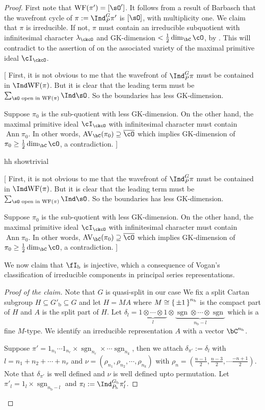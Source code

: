 \documentclass[12pt,a4paper]{amsart}
\newcommand{\trivial}[2][]{\if\relax\detokenize{#1}\relax
  {%
      \color{orange} \vspace{0em} $[$  #2 $]$
      \color{black}
  }
  \else
\ifx#1h
\ifcsname showtrivial\endcsname
{%
    \color{orange} \vspace{0em}  $[$ #2 $]$
    \color{black}
}
\fi
\else {\red Wrong argument!} \fi
\fi
}
\newcommand{\WF}{\mathrm{WF}}
\newcommand{\AV}{\mathrm{AV}}
\DeclareMathOperator{\Ann}{Ann}
\newcommand{\sgn}{\operatorname{sgn}}
\numberwithin{equation}{section}
\theoremstyle{remark}
\def\half{{\tfrac{1}{2}}}
\def\lamck{\lambda_\ckcO}
\def\nnb{n_{\mathrm b}}
\def\Gb{G_{\mathrm b}}
\def\Gpb{G'_{\mathrm b}}
\def\Pb{P_{\mathrm b}}
\newcommand{\Grt}{\cK}
\begin{document}
\begin{proof} First note that $\WF(\pi')=[\sO']$.
  It follows from a result of Barbasch \cite[Corollary 5.0.10]{B.Orbit} that the
  wavefront cycle of $\pi:=\Ind_{P}^{G}\pi'$ is $[\sO]$, with multiplicity one.
  We claim that $\pi$ is irreducible. If not, $\pi$ must contain an irreducible subquotient with infinitesimal
  character $\lambda_{\ckcO}$ and GK-dimension $<\half\dim_{\bC}\cO$, by \cite[Korollar 3.6]{BK}. This will
  contradict to the assertion of  on the associated variety of the maximal primitive ideal $\cI_{\ckcO}$.
  \trivial[h]{
    First, it is not obvious to me that the wavefront of $\Ind_{P}^{G}\pi$
    must be contained in $\Ind\WF(\pi)$. But it is clear that the leading term
    must be $\sum_{\sO\text{ open in } \WF(\pi)}\Ind\sO$. So the boundaries has
    less GK-dimension.

    Suppose $\pi_{0}$ is the sub-quotient with less GK-dimension.
    On the other hand, the maximal primitive ideal $\cI_{\ckcO}$  with infinitesimal
    character must contain $\Ann\pi_{0}$. In other words,
    $\AV_{\bC}(\pi_{0})\supseteq \bcO$ which implies GK-dimension of
    $\pi_{0}\geq \half\dim_{\bC}\cO$, a contradiction.
  }

  We now claim that $\fIb$ is injective, which a consequence of Vogan's
  classification of irreducible components in principal series representations.
  \begin{proof}[Proof of the claim]
    Note that $G$ is quasi-split in our case
    We fix a  split Cartan subgroup $H\subseteq \Gpb\subseteq G$ and let
    $H = MA$ where $M \cong \set{\pm 1}^{\nnb}$ is the compact part of $H$ and
    $A$ is the split part of $H$.
    Let
    $\delta_{l} = \underbrace{1\otimes \cdots \otimes 1}_{l}\otimes \underbrace{\sgn \otimes \cdots \otimes \sgn}_{\nnb-l}$
    which is a fine $M$-type. We identify an irreducible representation $A$ with
    a vector $\bC^{\nnb}$.

    Suppose
    $\pi' = 1_{n_{1}}\cdots 1_{n_{r}}\times \sgn_{n_{r}}\times \cdots \sgn_{n_{k}}$,
    then we attach $\delta_{\pi'}:=\delta_{l}$ with
    $l=n_{1}+n_{2}+\cdots + n_{r}$
    and $\nu = (\rho_{n_{1}}, \rho_{n_{2}},\cdots, \rho_{n_{k}})$ with
    $\rho_{n}= (\frac{n-1}{2},\frac{n-3}{2},\cdots \frac{-n+1}{2})$.
    Note that $\delta_{\pi'}$ is well defined and $\nu$ is well defined upto permutation.
    Let $\pi'_{l} = 1_{l}\times \sgn_{\nnb-l}$ and $\pi_{l}:=\Ind_{\Pb}^{\Gb}\pi'_{l}$.


\end{proof}
\end{proof}
\end{document}
